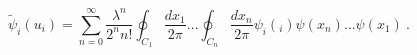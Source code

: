 \begin{equation}\label{redefR}
\tilde{\psi}_i(u_i)=\sum_{n=0}^{\infty}
\frac{\lambda^n}{2^n n!}
\oint_{C_1} \frac{dx_1}{2\pi }
\dots \oint_{C_n}\frac{dx_n}{2\pi}
\psi_i(_i)\psi(x_n)\dots \psi(x_1) \ .
\end{equation}

